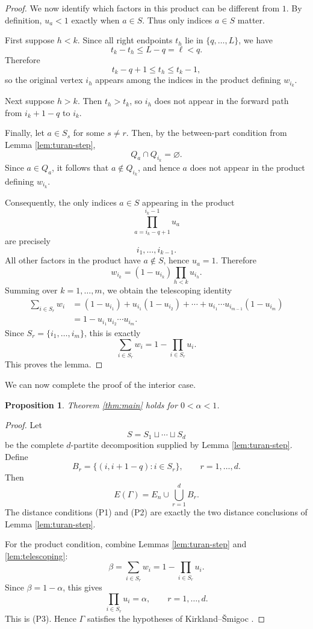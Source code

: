 \documentclass[11pt]{article}
\numberwithin{equation}{section}
\newtheorem{proposition}[theorem]{Proposition}
\begin{document}
\begin{proof}
We now identify which factors in this product can be different from $1$. By
definition, $u_a<1$ exactly when $a\in S$. Thus only indices $a\in S$ matter.

First suppose $h<k$. Since all right endpoints $t_h$ lie in
$\{q,\ldots,L\}$, we have
\[
        t_k-t_h\le L-q=\ell<q.
\]
Therefore
\[
        t_k-q+1\le t_h\le t_k-1,
\]
so the original vertex $i_h$ appears among the indices in the product
defining $w_{i_k}$.

Next suppose $h>k$. Then $t_h>t_k$, so $i_h$ does not appear in the forward
path from $i_k+1-q$ to $i_k$.

Finally, let $a\in S_s$ for some $s\ne r$. Then, by the between-part condition
from Lemma \ref{lem:turan-step},
\[
        Q_a\cap Q_{i_k}=\varnothing.
\]
Since $a\in Q_a$, it follows that $a\notin Q_{i_k}$, and hence $a$ does not
appear in the product defining $w_{i_k}$.

Consequently, the only indices $a\in S$ appearing in the product
\[
        \prod_{a=i_k-q+1}^{i_k-1}u_a
\]
are precisely
\[
        i_1,\ldots,i_{k-1}.
\]
All other factors in the product have $a\notin S$, hence $u_a=1$. Therefore
\[
        w_{i_k}=(1-u_{i_k})\prod_{h<k}u_{i_h}.
\]
Summing over $k=1,\ldots,m$, we obtain the telescoping identity
\[
\begin{aligned}
        \sum_{i\in S_r}w_i
        &=(1-u_{i_1})
          +u_{i_1}(1-u_{i_2})
          +\cdots
          +u_{i_1}\cdots u_{i_{m-1}}(1-u_{i_m})\\
        &=1-u_{i_1}u_{i_2}\cdots u_{i_m}.
\end{aligned}
\]
Since $S_r=\{i_1,\ldots,i_m\}$, this is exactly
\[
        \sum_{i\in S_r}w_i=1-\prod_{i\in S_r}u_i.
\]
This proves the lemma.
\end{proof}

We can now complete the proof of the interior case.

\begin{proposition}\label{prop:interior}
Theorem \ref{thm:main} holds for $0<\alpha<1$.
\end{proposition}

\begin{proof}
Let
\[
        S=S_1\sqcup\cdots\sqcup S_d
\]
be the complete $d$-partite decomposition supplied by Lemma
\ref{lem:turan-step}. Define
\[
        B_r=\{(i,i+1-q):i\in S_r\},\qquad r=1,\ldots,d.
\]
Then
\[
        E(\Gamma)=E_n\cup\bigcup_{r=1}^d B_r.
\]
The distance conditions (P1) and (P2) are exactly the two distance conclusions
of Lemma \ref{lem:turan-step}.

For the product condition, combine Lemmas \ref{lem:turan-step} and
\ref{lem:telescoping}:
\[
        \beta=\sum_{i\in S_r}w_i=1-\prod_{i\in S_r}u_i.
\]
Since $\beta=1-\alpha$, this gives
\[
        \prod_{i\in S_r}u_i=\alpha,\qquad r=1,\ldots,d.
\]
This is (P3). Hence $\Gamma$ satisfies the hypotheses of Kirkland--\v{S}migoc
\cite[Proposition 7.1]{KirklandSmigoc}.
\end{proof}
\end{document}
